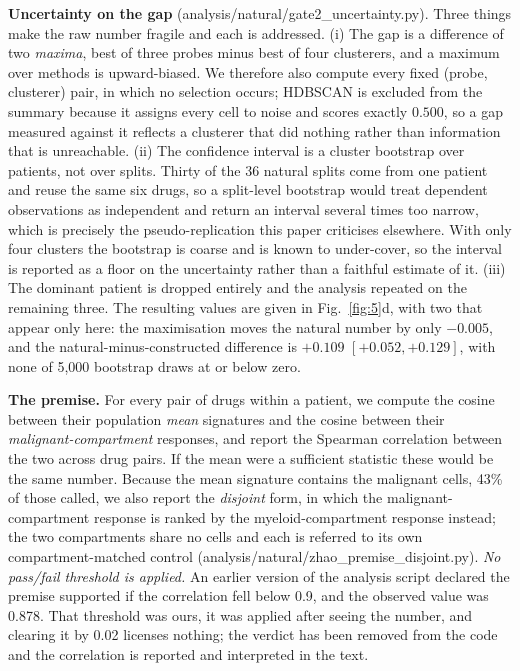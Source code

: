 \documentclass[11pt,letterpaper]{article}
\begin{document}
\textbf{Uncertainty on the gap} (analysis/natural/gate2\_uncertainty.py). Three things make the raw
number fragile and each is addressed. (i) The gap is a difference of two \emph{maxima}, best of three
probes minus best of four clusterers, and a maximum over methods is upward-biased. We therefore also
compute every fixed (probe, clusterer) pair, in which no selection occurs; HDBSCAN is excluded from
the summary because it assigns every cell to noise and scores exactly $0.500$, so a gap measured
against it reflects a clusterer that did nothing rather than information that is unreachable.
(ii) The confidence interval is a cluster bootstrap over patients, not over splits. Thirty
of the 36 natural splits come from one patient and reuse the same six drugs, so a split-level
bootstrap would treat dependent observations as independent and return an interval several times too
narrow, which is precisely the pseudo-replication this paper criticises elsewhere. With only four
clusters the bootstrap is coarse and is known to under-cover, so the interval is reported as a floor
on the uncertainty rather than a faithful estimate of it. (iii) The dominant patient is dropped
entirely and the analysis repeated on the remaining three. The resulting values are given in Fig.~\ref{fig:5}d, with two that appear only here: the maximisation moves the natural number by only $-0.005$, and the natural-minus-constructed difference is $+0.109$ $[+0.052, +0.129]$, with none of 5{,}000 bootstrap draws at or below zero.

\textbf{The premise.} For every pair of drugs within a patient, we compute the cosine between their
population \emph{mean} signatures and the cosine between their \emph{malignant-compartment}
responses, and report the Spearman correlation between the two across drug pairs. If the mean were a
sufficient statistic these would be the same number. Because the mean signature contains the
malignant cells, 43\% of those called, we also report the \emph{disjoint} form, in which the
malignant-compartment response is ranked by the myeloid-compartment response instead; the two
compartments share no cells and each is referred to its own compartment-matched control
(analysis/natural/zhao\_premise\_disjoint.py). \emph{No pass/fail threshold is applied.} An
earlier version of the analysis script declared the premise supported if the correlation fell below
0.9, and the observed value was 0.878. That threshold was ours, it was applied after seeing the
number, and clearing it by 0.02 licenses nothing; the verdict has been removed from the code and
the correlation is reported and interpreted in the text.
\end{document}
